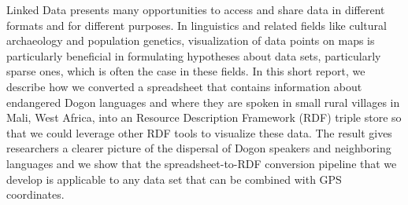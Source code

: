 
Linked Data presents many opportunities to access and share data in different formats and for different purposes. In linguistics and related fields like cultural archaeology and population genetics, visualization of data points on maps is particularly beneficial in formulating hypotheses about data sets, particularly sparse ones, which is often the case in these fields. In this short report, we describe how we converted a spreadsheet that contains information about endangered Dogon languages and where they are spoken in small rural villages in Mali, West Africa, into an Resource Description Framework (RDF) triple store so that we could leverage other RDF tools to visualize these data. The result gives researchers a clearer picture of the dispersal of Dogon speakers and neighboring languages and we show that the spreadsheet-to-RDF conversion pipeline that we develop is applicable to any data set that can be combined with GPS coordinates.
